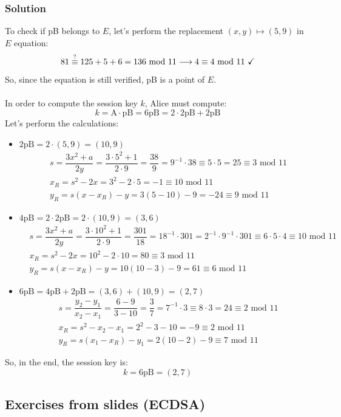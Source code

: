 \documentclass[11pt, a4paper]{article}
\newcommand{\mymod}{
    \text{ mod }
}
\begin{document}
\subsubsection*{Solution}
To check if pB belongs to $E$, let's perform the replacement $(x,y)\mapsto(5,9)$ in $E$ equation:
$$81\stackrel{\text{?}}{\equiv}125+5+6=136\mymod11\longrightarrow4\equiv4\mymod11\text{ \checkmark}$$
So, since the equation is still verified, pB is a point of $E$.\\\\
In order to compute the session key $k$, Alice must compute:
$$k=\text{A}\cdot\text{pB}=6\text{pB}=2\cdot2\text{pB}+2\text{pB}$$
Let's perform the calculations:
\begin{itemize}
    \item $2\text{pB}=2\cdot(5,9)=(10,9)$
    \begin{align*}
        &s=\dfrac{3x^2+a}{2y}=\dfrac{3\cdot5^2+1}{2\cdot9}=\dfrac{38}{9}=9^{-1}\cdot38\equiv5\cdot5=25\equiv3\mymod11\\
        &x_R=s^2-2x=3^2-2\cdot5=-1\equiv10\mymod11\\
        &y_R=s(x-x_R)-y=3(5-10)-9=-24\equiv9\mymod11
    \end{align*}
    \item $4\text{pB}=2\cdot2\text{pB}=2\cdot(10,9)=(3,6)$
    \begin{align*}
        &s=\dfrac{3x^2+a}{2y}=\dfrac{3\cdot10^2+1}{2\cdot9}=\dfrac{301}{18}=18^{-1}\cdot301=2^{-1}\cdot9^{-1}\cdot301\equiv6\cdot5\cdot4\equiv10\mymod11\\
        &x_R=s^2-2x=10^2-2\cdot10=80\equiv3\mymod11\\
        &y_R=s(x-x_R)-y=10(10-3)-9=61\equiv6\mymod11
    \end{align*}
    \item $6\text{pB}=4\text{pB}+2\text{pB}=(3,6)+(10,9)=(2,7)$
    \begin{align*}
        &s=\dfrac{y_2-y_1}{x_2-x_1}=\dfrac{6-9}{3-10}=\dfrac{3}{7}=7^{-1}\cdot 3\equiv8\cdot3=24\equiv2\mymod11\\
        &x_R=s^2-x_2-x_1=2^2-3-10=-9\equiv2\mymod11\\
        &y_R=s(x_1-x_R)-y_1=2(10-2)-9\equiv7\mymod11
    \end{align*}
\end{itemize}
So, in the end, the session key is:
$$k=6\text{pB}=(2,7)$$

\newpage
\subsection{Exercises from slides (ECDSA)}
\end{document}
